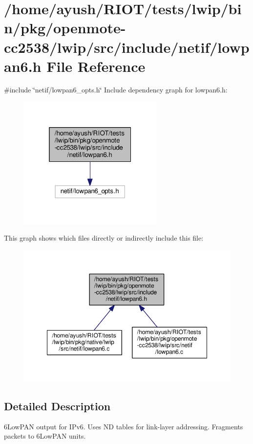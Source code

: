 \hypertarget{openmote-cc2538_2lwip_2src_2include_2netif_2lowpan6_8h}{}\section{/home/ayush/\+R\+I\+O\+T/tests/lwip/bin/pkg/openmote-\/cc2538/lwip/src/include/netif/lowpan6.h File Reference}
\label{openmote-cc2538_2lwip_2src_2include_2netif_2lowpan6_8h}
{\ttfamily \#include \char`\"{}netif/lowpan6\+\_\+opts.\+h\char`\"{}}\newline
Include dependency graph for lowpan6.\+h\+:
\nopagebreak
\begin{figure}[H]
\begin{center}
\leavevmode
\includegraphics[width=205pt]{openmote-cc2538_2lwip_2src_2include_2netif_2lowpan6_8h__incl}
\end{center}
\end{figure}
This graph shows which files directly or indirectly include this file\+:
\nopagebreak
\begin{figure}[H]
\begin{center}
\leavevmode
\includegraphics[width=348pt]{openmote-cc2538_2lwip_2src_2include_2netif_2lowpan6_8h__dep__incl}
\end{center}
\end{figure}


\subsection{Detailed Description}
6\+Low\+P\+AN output for I\+Pv6. Uses ND tables for link-\/layer addressing. Fragments packets to 6\+Low\+P\+AN units. 